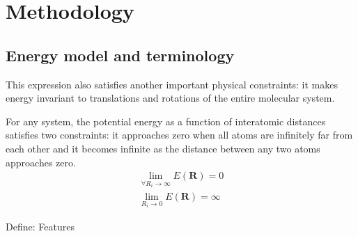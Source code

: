 \documentclass[aps,prl,reprint,amsmath,amssymb,nature]{revtex4-1}
\begin{document}
\section{Methodology}

\subsection{Energy model and terminology}


This expression also satisfies another important physical constraints: it makes energy invariant to translations and rotations of the entire molecular system. 

For any system, the potential energy as a function of interatomic distances satisfies two constraints: it approaches zero when all atoms are infinitely far from each other and it becomes infinite as the distance between any two atoms approaches zero.
%
\begin{eqnarray}
\lim_{\forall R_i \rightarrow \infty} E (\mathbf{R}) = 0 \\
\lim_{R_i \rightarrow 0} E (\mathbf{R}) = \infty
\end{eqnarray}

Define: Features
\end{document}
